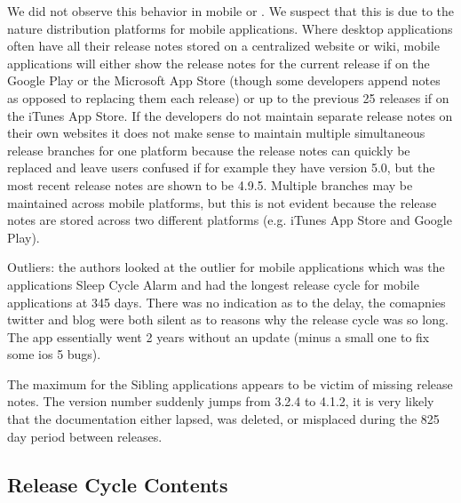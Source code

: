 \documentclass{acm_proc_article-sp}
\begin{document}
We did not observe this behavior in mobile or \sibs. We suspect that this is due to the nature distribution platforms for mobile applications.
Where desktop applications often have all their release notes stored on a centralized website or wiki, mobile applications will either show the release notes for the current release if on the Google Play or the Microsoft App Store (though some developers append notes as opposed to replacing them each release) or up to the previous 25 releases if on the iTunes App Store. 
If the developers do not maintain separate release notes on their own websites it does not make sense to maintain multiple simultaneous release branches for one platform because the release notes can quickly be replaced and leave users confused if for example they have version 5.0, but the most recent release notes are shown to be 4.9.5.
Multiple branches may be maintained across mobile platforms, but this is not evident because the release notes are stored across two different platforms (e.g. iTunes App Store and Google Play).


Outliers: the authors looked at the outlier for mobile applications which was the applications Sleep Cycle Alarm and had the longest release cycle  for mobile applications at 345 days. There was no indication as to the delay, the comapnies twitter and blog were both silent as to reasons why the release cycle was so long.
The app essentially went 2 years without an update (minus a small one to fix some ios 5 bugs).

The maximum for the Sibling applications appears to be victim of missing release notes. 
The version number suddenly jumps from 3.2.4 to 4.1.2, it is very likely that the documentation either lapsed, was deleted, or misplaced during the 825 day period between releases.




\subsection{Release Cycle Contents}




\begin{center}

\label{tab:enhancements}
\end{center}

\begin{center}

\label{tab:sumenhance}
\end{center}

\begin{center}

\label{tab:features}
\end{center}
\end{document}
